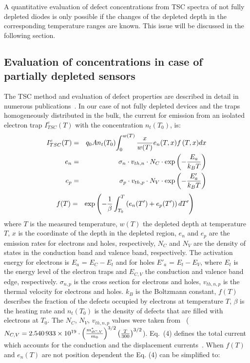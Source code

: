\documentclass[final, 5p, times]{elsarticle}
\begin{document}
\par
A quantitative evaluation of defect concentrations from TSC spectra of not fully depleted diodes is only possible if the changes of the depleted depth in the corresponding temperature ranges are known. This issue will be discussed in the following section.
\subsection{Evaluation of concentrations in case of partially depleted sensors}
The TSC method and evaluation of defect properties are described in detail in
numerous publications~\cite{b15,b16,b17,b18,b19}. In our case of not fully depleted devices and the traps homogeneously distributed in the bulk, the current for emission from an isolated electron trap $I^{e}_{TSC} (T)$ with the concentration $n_t(T_0)$, is:
\begin{eqnarray} 
I^{e}_{TSC} (T) & = & q_0 A  n_t(T_0) { \int_0^{w(T)} {x \over {w(T)}}  e_{n}(T, x)  f\left(T, x\right)} dx \\
e_{n} & = & {\sigma_{n} \cdot v_{th,n} \cdot N_{C} \cdot \exp{\left(-{E_a \over
{k_B T}}\right)}}\\
e_{p} & = & {\sigma_{p} \cdot v_{th,p} \cdot N_{V} \cdot \exp{\left(-{E'_{a}
\over {k_B T}}\right)}}
\end{eqnarray}
\begin{eqnarray} 
f(T) & = & {\exp{\left(- {1 \over{\beta}}
\int_{T_0}^{T}{\left(e_n(T')+e_p(T')\right)} \, dT'\right)}}\
\end{eqnarray}
where $T$ is the measured temperature, $w(T)$ the depleted depth at temperature
$T$, $x$ is the coordinate of the depth in the depleted region, $e_n$ and $e_p$ are the emission rates for electrons and holes, respectively, $N_C$ and $N_V$ are the density of states in the conduction band and valence band, respectively. The activation energy for electrons is $E_a$ = $E_C - E_t$ and for holes $E'_a$ = $E_t - E_V$, where $E_t$ is the energy level of the electron traps and $E_{C,V}$ the conduction and valence band edge, respectively. $\sigma_{n,p}$ is the cross section for electrons and holes, $v_{th,n,p}$ is the thermal velocity for electrons and holes. $k_B$ is the Boltzmann constant, $f(T)$ describes the fraction of the defects occupied by electrons at temperature $T$, $\beta$ is the heating rate and $n_t(T_0)$ is the density of defects that are filled with electrons at $T_0$. The $N_C$, $N_V$, $v_{th,n,p}$ values were taken from~\cite{b32} ($N_{C,V} = \num{2.540933e19} \cdot \left({{m^*_{dC,V}} \over {m_0}}\right)^{3/2} \left({{T} \over {300}}\right)^{3/2}$). Eq.~(4) defines the total current which accounts for the conduction and the displacement currents~\cite{b15}. When $f(T)$ and $e_n(T)$ are not position dependent the Eq. (4) can be simplified to:
\end{document}

